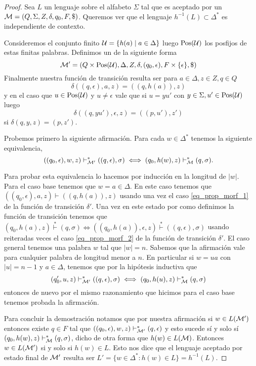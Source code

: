 \documentclass[tesis.tex]{subfiles}
\begin{document}
\begin{proof}
	Sea $L$ un lenguaje \ic sobre el alfabeto $\Sigma$ tal que es aceptado por un \APND ${\cal M } = (Q, \Sigma, Z, \delta, q_0, F, \$)$.
	Queremos ver que el lenguaje $h^{-1}(L) \subset \Delta^*$ es independiente de contexto.
	 
	 Consideremos el conjunto finito ${\cal U } = \{ h(a) \mid a \in \Delta \}$ luego $\text{Pos}(\cal U)$ los posfijos de estas finitas palabras.
	Definimos un \APND de la siguiente forma
	\[
	{\cal M' } = (Q \times \text{Pos}({\cal U}), \Delta, Z, \delta, (q_0, \epsilon), F \times \{ \epsilon \}, \$)
	\]
	Finalmente nuestra función de transición resulta ser para $a \in \Delta, z \in Z, q \in Q$
	\begin{equation}\label{eq_prop_morf_1}
		\delta((q,\epsilon),a,z) = ((q,h(a)),z)
	\end{equation} 
	y en el caso que $u \in \text{Pos}(\cal U)$ y $u \neq \epsilon$ vale que si $u = yu'$ con $y \in \Sigma, u' \in \text{Pos}(\cal U)$ luego
	\begin{equation}\label{eq_prop_morf_2}
		\delta((q,yu'),\epsilon,z) = ((p,u'),z')
	\end{equation}
	si $\delta(q,y,z) = (p,z')$.
	
	Probemos primero la siguiente afirmación.
	Para cada $w \in \Delta^*$ tenemos la siguiente equivalencia,
	\[
	((q_0, \epsilon),w,z) \vdash^*_{\cal M'} ((q,\epsilon), \sigma) \iff (q_0,h(w), z) \vdash^*_{\cal M} (q, \sigma).
	\]
	
	Para probar esta equivalencia lo hacemos por inducción en la longitud de $|w|$.
	Para el caso base tenemos que $w = a \in \Delta$.
	En este caso tenemos que $((q_0, \epsilon), a, z) \vdash ((q,h(a)), z)$ usando una vez el caso \ref{eq_prop_morf_1} de la función de transición $\delta'$.
	Una vez en este estado por como definimos la función de transición tenemos que $ (q_0,h(a), z) \overset{*}{\vdash }(q, \sigma)  \iff ((q_0,h(a)), \epsilon ,z) \overset{*}{\vdash} ((q,\epsilon), \sigma)$ usando reiteradas veces el caso \ref{eq_prop_morf_2} de la función de transición $\delta'$.
	El caso general tenemos una palabra $w$ tal que $|w|=n$.
	Sabemos que la afirmación vale para cualquier palabra de longitud menor a $n$.
	En particular si $w=ua$ con $|u|=n-1$ y $a \in \Delta$, tenemos que por la hipótesis inductiva que 
	\[
	(q_0',u,z) \vdash^*_{\cal M'} ((q,\epsilon), \sigma) \iff (q_0,h(u), z) \vdash^*_{\cal M} (q, \sigma)
	\]
	entonces de nuevo por el mismo razonamiento que hicimos para el caso base tenemos probada la afirmación.
	
	Para concluir la demostración notamos que por nuestra afirmación si $w \in L(\cal M')$ entonces existe $q \in F$ tal que $ ((q_0, \epsilon),w,z) \vdash^*_{\cal M'} (q,\epsilon) $ y esto sucede sí y solo sí $(q_0,h(w), z) \vdash^*_{\cal M} (q, \sigma)$, dicho de otra forma que $h(w) \in L(\cal M)$.	
	Entonces $w \in L(\cal M')$ si y solo si $h(w) \in L$.
	Esto nos dice que el lenguaje aceptado por estado final de $\cal M'$ resulta ser $L' = \{ w \in \Delta^* : h(w) \in L \} = h^{-1}(L)$.
\end{proof}
\end{document}
